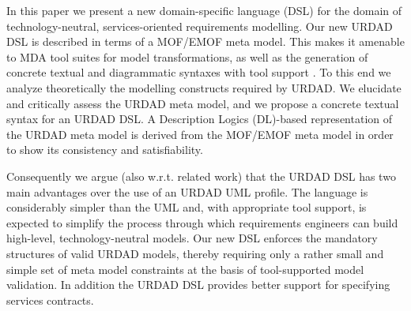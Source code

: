 In this paper we present a new domain-specific language (DSL) for the domain of technology-neutral, services-oriented requirements modelling. Our new URDAD DSL is described in terms of a MOF/EMOF meta model. This makes it amenable to MDA tool suites for model transformations, as well as the generation of concrete textual and diagrammatic syntaxes with tool support \cite{gronback_model_2008}. To this end we analyze theoretically the modelling constructs required by URDAD. We elucidate and critically assess the URDAD meta model, and we propose a concrete textual syntax for an URDAD DSL. A Description Logics (DL)-based representation of the URDAD meta model is derived from the MOF/EMOF meta model in order to show its consistency and satisfiability.

Consequently we argue (also w.r.t. related work) that the URDAD DSL has two main advantages over the use of an URDAD UML profile. The language is considerably simpler than the UML and, with appropriate tool support, is expected to simplify the process through which requirements engineers can build high-level, technology-neutral models. Our new DSL enforces the mandatory structures of valid URDAD models, thereby requiring only a rather small and simple set of meta model constraints at the basis of tool-supported model validation. In addition the URDAD DSL provides better support for specifying services contracts.

